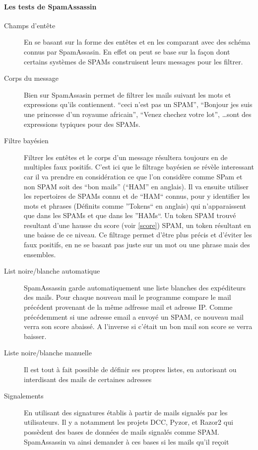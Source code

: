 \documentclass[a4paper,11pt]{article}
\begin{document}
\paragraph{Les tests de SpamAssassin }
\begin{description}
 \item [Champs d'entête] En se basant sur la forme des entêtes et en les comparant avec des schéma connus par SpamAssasin. En effet 
 on peut se base sur la façon dont certains systèmes de SPAMs construisent leurs messages pour les filtrer. 
 \item [Corps du message] Bien sur SpamAssasin permet de filtrer les mails suivant les mots et expressions qu'ils contiennent. 
 ``ceci n'est pas un SPAM'', ``Bonjour jes suis une princesse d'un royaume africain'', ``Venez chechez votre lot'', \dots sont des expressions
 typiques pour des SPAMs. 
 \item [Filtre bayésien] Filtrer les entêtes et le corps d'un message résultera toujours en de multiples faux positifs. C'est ici que le filtrage 
 bayésien se révèle interessant car il va prendre en considération ce que l'on considère comme SPam et non SPAM soit des ``bon mails'' (``HAM'' en anglais).
 Il va ensuite utiliser les repertoires de SPAMs connu et de ``HAM``  connus, pour y identifier les mots et phrases (Définits comme ''Tokens`` en anglais)
 qui n'apparaissent que dans les SPAMs et que dans les ''HAMs``.
 Un token SPAM trouvé resultant d'une hausse du score (voir \ref{score}) SPAM, un token résultant en une baisse de ce niveau. Ce filtrage permet d'être plus précis et d'éviter les faux positifs, 
 en ne se basant pas juste sur un mot ou une phrase mais des ensembles. 
 \item [List noire/blanche automatique] SpamAssassin garde automatiquement une liste blanches des expéditeurs des mails.
 Pour chaque nouveau mail le programme compare le mail précédent provenant de la même adfresse mail et adresse IP.
 Comme précédemment si une adresse email a envoyé un SPAM, ce nouveau mail verra son score abaissé. A l'inverse si c'était un bon mail son score 
 se verra baisser.
 \item [Liste noire/blanche manuelle] Il est tout à fait possible de définir ses propres listes, en autorisant ou 
 interdisant des mails de certaines adresses
 \item [Signalements] En utilisant des signatures établis à partir de mails signalés par les utilisateurs. Il y a notamment les projets DCC, Pyzor, et Razor2
 qui possèdent des bases de données de mails signalés comme SPAM. SpamAssassin va ainsi demander à ces bases si les mails qu'il reçoit 

\end{description}
\end{document}
